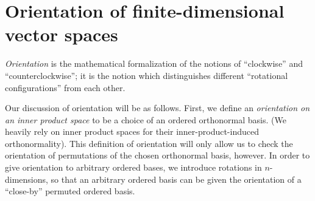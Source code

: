     
    


\newpage

\section{Orientation of finite-dimensional vector spaces}
\label{ch::exterior_pwrs::section::orientation}

\textit{Orientation} is the mathematical formalization of the notions of ``clockwise'' and ``counterclockwise''; it is the notion which distinguishes different ``rotational configurations'' from each other.

Our discussion of orientation will be as follows. First, we define an \textit{orientation on an inner product space} to be a choice of an ordered orthonormal basis. (We heavily rely on inner product spaces for their inner-product-induced orthonormality). This definition of orientation will only allow us to check the orientation of permutations of the chosen orthonormal basis, however. In order to give orientation to arbitrary ordered bases, we introduce rotations in $n$-dimensions, so that an arbitrary ordered basis can be given the orientation of a ``close-by'' permuted ordered basis.

